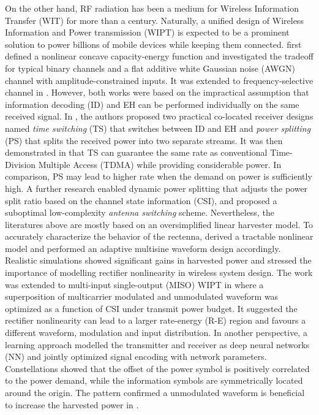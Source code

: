On the other hand, RF radiation has been a medium for Wireless Information Transfer (WIT) for more than a century. Naturally, a unified design of Wireless Information and Power transmission (WIPT) is expected to be a prominent solution to power billions of mobile devices while keeping them connected. \cite{R.Varshney2008} first defined a nonlinear concave capacity-energy function and investigated the tradeoff for typical binary channels and a flat additive white Gaussian noise (AWGN) channel with amplitude-constrained inputs. It was extended to frequency-selective channel in \cite{Grover2010}. However, both works were based on the impractical assumption that information decoding (ID) and EH can be performed individually on the same received signal. In \cite{Zhang2013}, the authors proposed two practical co-located receiver designs named \textit{time switching} (TS) that switches between ID and EH and \textit{power splitting} (PS) that splits the received power into two separate streams. It was then demonstrated in \cite{Zhou2013a} that TS can guarantee the same rate as conventional Time-Division Multiple Access (TDMA) while providing considerable power. In comparison, PS may lead to higher rate when the demand on power is sufficiently high. A further research \cite{Liu2013} enabled dynamic power splitting that adjusts the power split ratio based on the channel state information (CSI), and proposed a suboptimal low-complexity \textit{antenna switching} scheme. Nevertheless, the literatures above are mostly based on an oversimplified linear harvester model. To accurately characterize the behavior of the rectenna, \cite{Clerckx2016} derived a tractable nonlinear model and performed an adaptive multisine waveform design accordingly. Realistic simulations showed significant gains in harvested power and stressed the importance of modelling rectifier nonlinearity in wireless system design. The work was extended to multi-input single-output (MISO) WIPT in \cite{Clerckx2018} where a superposition of multicarrier modulated and unmodulated waveform was optimized as a function of CSI under transmit power budget. It suggested the rectifier nonlinearity can lead to a larger rate-energy (R-E) region and favours a different waveform, modulation and input distribution. In another perspective, a learning approach \cite{Varasteh2018} modelled the transmitter and receiver as deep neural networks (NN) and jointly optimized signal encoding with network parameters. Constellations showed that the offset of the power symbol is positively correlated to the power demand, while the information symbols are symmetrically located around the origin. The pattern confirmed a unmodulated waveform is beneficial to increase the harvested power in \cite{Clerckx2018}.
